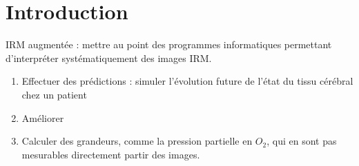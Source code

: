 \section{Introduction}


IRM augment\'ee : mettre au point des programmes informatiques permettant d'interpr\'eter syst\'ematiquement des images IRM.
\begin{enumerate}
\item Effectuer des pr\'edictions : simuler l'\'evolution future de l'\'etat du tissu c\'er\'ebral chez un patient%

\item Am\'eliorer 
\item Calculer des grandeurs, comme la pression partielle en $O_2$, qui en sont pas mesurables directement  partir des images.
\end{enumerate}

